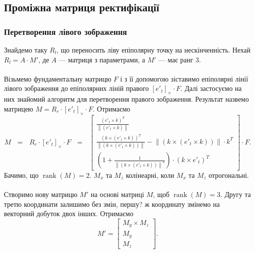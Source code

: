 \subsection{Проміжна матриця ректифікації}

















\subsubsection{Перетворення лівого зображення}
Знайдемо таку $R_l$, що переносить ліву епіполярну точку на нескінченність. 
Нехай $R_l = A \cdot M'$, де $A$ --- матриця з параметрами, а $M'$ --- має ранг 
3.
\\\\
\indent
Візьмемо фундаментальну матрицю $F$ і з її допомогою зіставимо епіполярні лінії
лівого зображення до епіполярних ліній правого ${[{e'}_t]}_\times \cdot F$. 
Далі застосуємо на них знайомий алгоритм для перетворення правого зображення. 
Результат назвемо матрицею $M = R_r \cdot {[{e'}_t]}_\times \cdot F$. Отримаємо
\begin{equation}
M \:\:\: = \:\:\: R_r \cdot {[{e'}_t]}_\times \cdot F \:\:\: = \:\:\:
\left[
\begin{matrix}
\frac{{({e'}_t \times k)}^T}
{\left \| ({e'}_t \times k) \right \|}\\
\frac{{(k \times ({e'}_t \times k))}^T}
{\left \| (k \times ({e'}_t \times k)) \right \|} 
- \left \| (k \times ({e'}_t \times k)) \right \| \cdot k^T\\
(1 + \frac{1}{{\left \| (k \times ({e'}_t \times k)) \right \|}^2}) \cdot {(k \times {e'}_t)}^T\
\end{matrix}
\right]
\cdot F.
\end{equation}
Бачимо, що $\operatorname{rank}(M) = 2$. $M_x$ та $M_z$ колінеарні, 
коли $M_x$ та $M_z$ отрогональні.
\\\\
\indent
Створимо нову матрицю $M'$ на основі матриці $M$, щоб 
$\operatorname{rank}(M) = 3$. Другу та третю координати залишимо без 
змін, першу? ж координату змінемо на векторний добуток двох інших. 
Отримаємо
\begin{equation}
    M' =
    \left[
    \begin{matrix}
    M_y \times M_z\\
    M_y\\
    M_z\
    \end{matrix}
    \right].
\end{equation}
